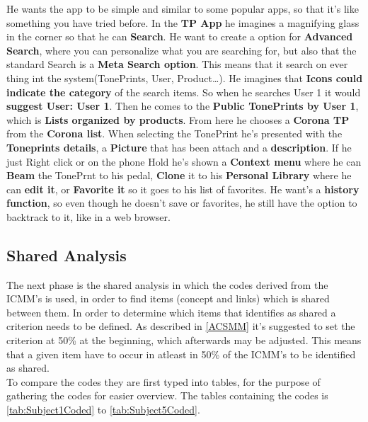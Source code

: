 He wants the app to be simple and similar to some popular apps, so that it’s like something you have tried before. In the \textbf{TP App} he imagines a magnifying glass in the corner so that he can \textbf{Search}. He want to create a option for \textbf{Advanced Search}, where you can personalize what you are searching for, but also that the standard Search is a \textbf{Meta Search option}. This means that it search on ever thing int the system(TonePrints, User, Product…). He imagines that \textbf{Icons could indicate the category} of the search items. So when he searches User 1 it would \textbf{suggest User: User 1}. Then he comes to the \textbf{Public TonePrints by User 1}, which is \textbf{Lists organized by products}. From here he chooses a \textbf{Corona TP} from the \textbf{Corona list}. When selecting the TonePrint he’s presented with the \textbf{Toneprints details}, a \textbf{Picture} that has been attach and a \textbf{description}. If he just Right click or on the phone Hold he’s shown a \textbf{Context menu} where he can \textbf{Beam} the TonePrnt to his pedal, \textbf{Clone} it to his \textbf{Personal Library} where he can \textbf{edit it}, or \textbf{Favorite it} so it goes to his list of favorites. He want’s a \textbf{history function}, so even though he doesn’t save or favorites, he still have the option to backtrack to it, like in a web browser. 

\subsection{Shared Analysis}
\label{SharedAnalysis}
%
The next phase is the shared analysis in which the codes derived from the ICMM's is used, in order to find items (concept and links) which is shared between them. In order to determine which items that identifies as shared a criterion needs to be defined. As described in \autoref{ACSMM} it's suggested to set the criterion at 50\% at the beginning, which afterwards may be adjusted. This means that a given item have to occur in atleast in 50\% of the ICMM's to be identified as shared.\\
To compare the codes they are first typed into tables, for the purpose of gathering the codes for easier overview. The tables containing the codes is \autoref{tab:Subject1Coded} to \autoref{tab:Subject5Coded}. 

